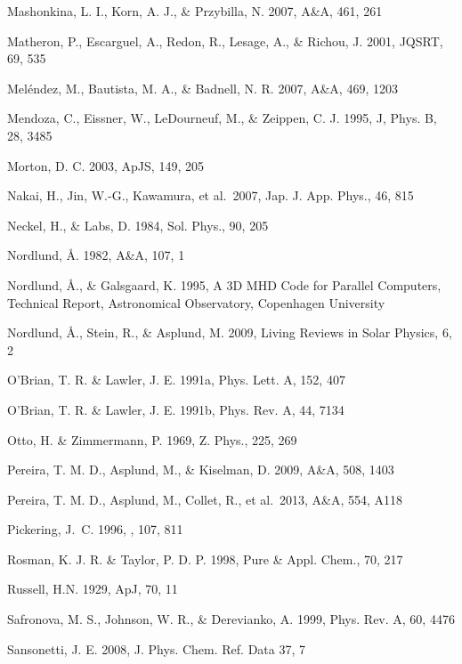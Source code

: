 \documentclass[traditabstract]{aa}
\begin{document}
\begin{thebibliography}{}
  Mashonkina, L. I., Korn, A. J., \& Przybilla, N. 2007, A\&A, 461, 261

  Matheron, P., Escarguel, A., Redon, R., Lesage, A., \& Richou, J. 2001, JQSRT, 69, 535

  Mel\'endez, M., Bautista, M. A., \& Badnell, N. R. 2007, A\&A, 469, 1203

  Mendoza, C., Eissner, W., LeDourneuf, M., \& Zeippen, C. J. 1995, J, Phys. B, 28, 3485

  Morton, D. C. 2003, ApJS, 149, 205

  Nakai, H., Jin, W.-G., Kawamura, et al.\ 2007, Jap. J. App. Phys., 46, 815

  Neckel, H., \& Labs, D. 1984, Sol. Phys., 90, 205
 
  Nordlund, \AA. 1982, A\&A, 107, 1

  Nordlund, \AA., \& Galsgaard, K. 1995, A 3D MHD Code for Parallel Computers, Technical Report, Astronomical Observatory, Copenhagen University

  Nordlund, \AA., Stein, R., \& Asplund, M. 2009, Living Reviews in Solar Physics, 6, 2
 
  O'Brian, T. R. \& Lawler, J. E. 1991a, Phys. Lett. A, 152, 407

  O'Brian, T. R. \& Lawler, J. E. 1991b, Phys. Rev. A, 44, 7134

  Otto, H. \& Zimmermann, P. 1969, Z. Phys., 225, 269

  Pereira, T. M. D., Asplund, M., \& Kiselman, D. 2009, A\&A, 508, 1403

  Pereira, T. M. D., Asplund, M., Collet, R., et al.\ 2013, A\&A, 554, A118

  {Pickering}, J.~C. 1996, \apjs, 107, 811

  Rosman, K. J. R. \& Taylor, P. D. P.  1998, Pure \& Appl. Chem., 70, 217
 
  Russell, H.N. 1929, ApJ, 70, 11

  Safronova, M. S., Johnson, W. R., \& Derevianko, A.  1999, Phys. Rev. A, 60, 4476

  Sansonetti, J. E. 2008, J. Phys. Chem. Ref. Data 37, 7


\end{thebibliography}
\end{document}
